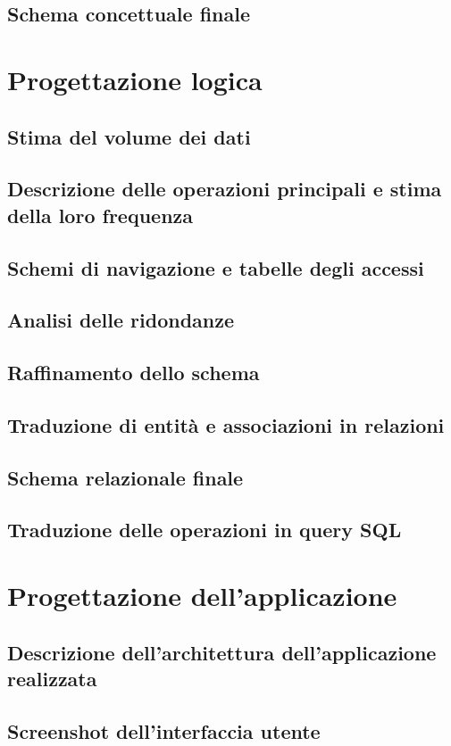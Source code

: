 \documentclass[12pt,a4paper]{report}
\begin{document}
\section{Schema concettuale finale}

\chapter{Progettazione logica}
\section{Stima del volume dei dati}
\section{Descrizione delle operazioni principali e stima della loro frequenza}
\section{Schemi di navigazione e tabelle degli accessi}
\section{Analisi delle ridondanze}
\section{Raffinamento dello schema}
\section{Traduzione di entità e associazioni in relazioni}
\section{Schema relazionale finale}
\section{Traduzione delle operazioni in query SQL}

\chapter{Progettazione dell'applicazione}
\section{Descrizione dell'architettura dell'applicazione realizzata}
\section{Screenshot dell'interfaccia utente}
\end{document}
